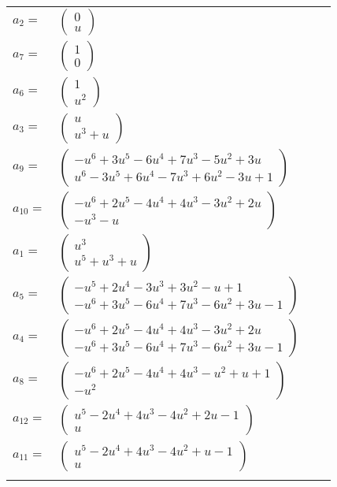 \documentclass[1p]{elsarticle_modified}
\theoremstyle{definition}
\begin{document}
\begin{tabular}{m{7pt} m{180pt} m{7pt} m{180pt} }
\flushright $a_{2}=$&$\begin{pmatrix}0\\u\end{pmatrix}$ \\
\flushright $a_{7}=$&$\begin{pmatrix}1\\0\end{pmatrix}$ \\
\flushright $a_{6}=$&$\begin{pmatrix}1\\u^2\end{pmatrix}$ \\
\flushright $a_{3}=$&$\begin{pmatrix}u\\u^3+u\end{pmatrix}$ \\
\flushright $a_{9}=$&$\begin{pmatrix}- u^6+3 u^5-6 u^4+7 u^3-5 u^2+3 u\\u^6-3 u^5+6 u^4-7 u^3+6 u^2-3 u+1\end{pmatrix}$ \\
\flushright $a_{10}=$&$\begin{pmatrix}- u^6+2 u^5-4 u^4+4 u^3-3 u^2+2 u\\- u^3- u\end{pmatrix}$ \\
\flushright $a_{1}=$&$\begin{pmatrix}u^3\\u^5+u^3+u\end{pmatrix}$ \\
\flushright $a_{5}=$&$\begin{pmatrix}- u^5+2 u^4-3 u^3+3 u^2- u+1\\- u^6+3 u^5-6 u^4+7 u^3-6 u^2+3 u-1\end{pmatrix}$ \\
\flushright $a_{4}=$&$\begin{pmatrix}- u^6+2 u^5-4 u^4+4 u^3-3 u^2+2 u\\- u^6+3 u^5-6 u^4+7 u^3-6 u^2+3 u-1\end{pmatrix}$ \\
\flushright $a_{8}=$&$\begin{pmatrix}- u^6+2 u^5-4 u^4+4 u^3- u^2+u+1\\- u^2\end{pmatrix}$ \\
\flushright $a_{12}=$&$\begin{pmatrix}u^5-2 u^4+4 u^3-4 u^2+2 u-1\\u\end{pmatrix}$ \\
\flushright $a_{11}=$&$\begin{pmatrix}u^5-2 u^4+4 u^3-4 u^2+u-1\\u\end{pmatrix}$\\&\end{tabular}
\end{document}
